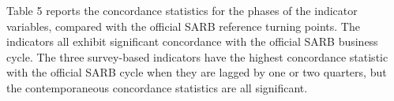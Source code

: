\documentclass[11pt,]{article}
\begin{document}
Table 5 reports the concordance statistics for the phases of the
indicator variables, compared with the official SARB reference turning
points. The indicators all exhibit significant concordance with the
official SARB business cycle. The three survey-based indicators have the
highest concordance statistic with the official SARB cycle when they are
lagged by one or two quarters, but the contemporaneous concordance
statistics are all significant.

\begin{table}[]
\centering
\caption{Concordance statistics with the SARB business cycle}
\end{table}
\end{document}
